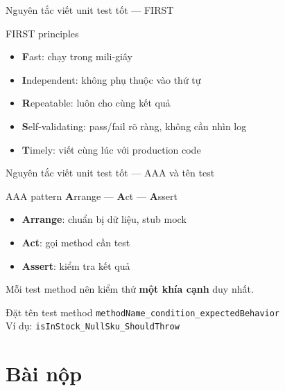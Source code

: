 \documentclass[aspectratio=169,12pt]{beamer}
\begin{document}
\begin{frame}[shrink=12]{Nguyên tắc viết unit test tốt --- FIRST}
  \begin{block}{FIRST principles}
    \begin{itemize}
      \item \textbf{F}ast: chạy trong mili-giây
      \item \textbf{I}ndependent: không phụ thuộc vào thứ tự
      \item \textbf{R}epeatable: luôn cho cùng kết quả
      \item \textbf{S}elf-validating: pass/fail rõ ràng, không cần nhìn log
      \item \textbf{T}imely: viết cùng lúc với production code
    \end{itemize}
  \end{block}
\end{frame}

\begin{frame}[shrink=12]{Nguyên tắc viết unit test tốt --- AAA và tên test}
  \begin{block}{AAA pattern}
    \textbf{A}rrange --- \textbf{A}ct --- \textbf{A}ssert\\[0.3em]
    \begin{itemize}
      \item \textbf{Arrange}: chuẩn bị dữ liệu, stub mock
      \item \textbf{Act}: gọi method cần test
      \item \textbf{Assert}: kiểm tra kết quả
    \end{itemize}
    Mỗi test method nên kiểm thử \textbf{một khía cạnh} duy nhất.
  \end{block}

  \begin{alertblock}{Đặt tên test method}
    \texttt{methodName\_condition\_expectedBehavior}\\[0.2em]
    Ví dụ: \texttt{isInStock\_NullSku\_ShouldThrow}
  \end{alertblock}
\end{frame}

\section{Bài nộp}
\end{document}
